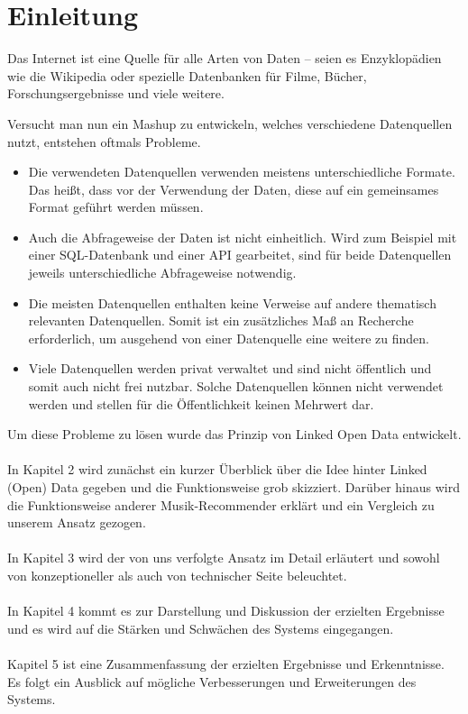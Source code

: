 \section{Einleitung}

Das Internet ist eine Quelle für alle Arten von Daten -- seien es Enzyklopädien wie die Wikipedia oder spezielle Datenbanken für Filme, Bücher, Forschungsergebnisse und viele weitere.


Versucht man nun ein Mashup zu entwickeln, welches verschiedene Datenquellen nutzt, entstehen oftmals Probleme.

\begin{itemize}
\item Die verwendeten Datenquellen verwenden meistens unterschiedliche Formate. Das heißt, dass vor der Verwendung der Daten, diese auf ein gemeinsames Format geführt werden müssen.
\item Auch die Abfrageweise der Daten ist nicht einheitlich. Wird zum Beispiel mit einer SQL-Datenbank und einer API gearbeitet, sind für beide Datenquellen jeweils unterschiedliche Abfrageweise notwendig.
\item Die meisten Datenquellen enthalten keine Verweise auf andere thematisch relevanten Datenquellen. Somit ist ein zusätzliches Maß an Recherche erforderlich, um ausgehend von einer Datenquelle eine weitere zu finden.
\item Viele Datenquellen werden privat verwaltet und sind nicht öffentlich und somit auch nicht frei nutzbar. Solche Datenquellen können nicht verwendet werden und stellen für die Öffentlichkeit keinen Mehrwert dar.
\end{itemize}

Um diese Probleme zu lösen wurde das Prinzip von Linked Open Data entwickelt.

\paragraph{} In Kapitel 2 wird zunächst ein kurzer Überblick über die Idee hinter Linked (Open) Data gegeben und die Funktionsweise grob skizziert. Darüber hinaus wird die Funktionsweise anderer Musik-Recommender erklärt und ein Vergleich zu unserem Ansatz gezogen.

\paragraph{} In Kapitel 3 wird der von uns verfolgte Ansatz im Detail erläutert und sowohl von konzeptioneller als auch von technischer Seite beleuchtet.

\paragraph{} In Kapitel 4 kommt es zur Darstellung und Diskussion der erzielten Ergebnisse und es wird auf die Stärken und Schwächen des Systems eingegangen.

\paragraph{} Kapitel 5 ist eine Zusammenfassung der erzielten Ergebnisse und Erkenntnisse. Es folgt ein Ausblick auf mögliche Verbesserungen und Erweiterungen des Systems.